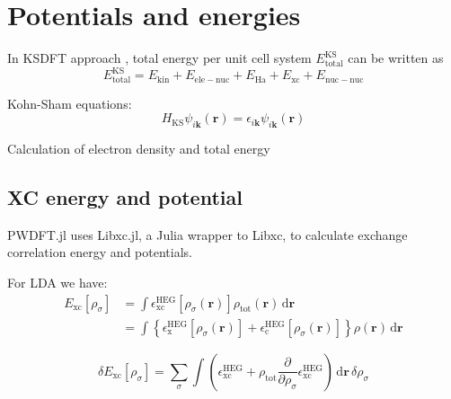 \section{Potentials and energies}

In KSDFT approach \cite{Hohenberg1964,Kohn1965}, total energy per unit cell system
$E^{\mathrm{KS}}_{\mathrm{total}}$ can be written as
\begin{equation}
E^{\mathrm{KS}}_{\mathrm{total}} =
E_{\mathrm{kin}} + E_{\mathrm{ele-nuc}} +
E_{\mathrm{Ha}} + E_{\mathrm{xc}} + E_{\mathrm{nuc-nuc}}
\label{eq:E_KS_total}
\end{equation}

Kohn-Sham equations:
\begin{equation}
H_{\mathrm{KS}} \psi_{i\mathbf{k}}(\mathbf{r}) =
\epsilon_{i\mathbf{k}} \psi_{i\mathbf{k}}(\mathbf{r})
\end{equation}





Calculation of electron density and total energy

\subsection{XC energy and potential}

\textsf{PWDFT.jl} uses \textsf{Libxc.jl}\cite{Libxc.jl}, a Julia wrapper to
\textsf{Libxc}\cite{Marques2012,Lehtola2018}, to calculate exchange correlation
energy and potentials.

For LDA we have:
\begin{align}
E_{\mathrm{xc}}\left[\rho_{\sigma}\right] & = \int \epsilon^{\mathrm{HEG}}_{\mathrm{xc}}
\left[ \rho_{\sigma}(\mathbf{r}) \right]
\rho_{\mathrm{tot}}(\mathbf{r})\, \mathrm{d}\mathbf{r} \\
& = \int \left\{
\epsilon^{\mathrm{HEG}}_{\mathrm{x}} \left[ \rho_{\sigma}(\mathbf{r}) \right] +
\epsilon^{\mathrm{HEG}}_{\mathrm{c}} \left[ \rho_{\sigma}(\mathbf{r}) \right]
\right\}
\rho(\mathbf{r})\, \mathrm{d}\mathbf{r}
\end{align}

\begin{equation}
\delta E_{\mathrm{xc}}\left[\rho_{\sigma}\right] =
\sum_{\sigma} \int
\left(
\epsilon^{\mathrm{HEG}}_{\mathrm{xc}} +
\rho_{\mathrm{tot}} \frac{\partial}{\partial \rho_{\sigma}} \epsilon^{\mathrm{HEG}}_{\mathrm{xc}}
\right)
\, \mathrm{d}\mathbf{r}\,\delta \rho_{\sigma}
\end{equation}


